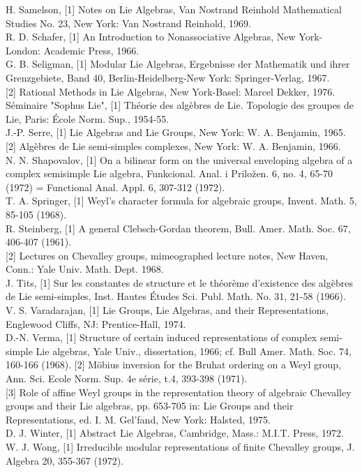 \documentclass[10pt]{article}
\begin{document}
H. Samelson, [1] Notes on Lie Algebras, Van Nostrand Reinhold Mathematical Studies No. 23, New York: Van Nostrand Reinhold, 1969.\\[0pt]
R. D. Schafer, [1] An Introduction to Nonassociative Algebras, New York-London: Academic Press, 1966.\\[0pt]
G. B. Seligman, [1] Modular Lie Algebras, Ergebnisse der Mathematik und ihrer Grenzgebiete, Band 40, Berlin-Heidelberg-New York: Springer-Verlag, 1967.\\[0pt]
[2] Rational Methods in Lie Algebras, New York-Basel: Marcel Dekker, 1976.\\[0pt]
Séminaire "Sophus Lie", [1] Théorie des algèbres de Lie. Topologie des groupes de Lie, Paris: École Norm. Sup., 1954-55.\\[0pt]
J.-P. Serre, [1] Lie Algebras and Lie Groups, New York: W. A. Benjamin, 1965.\\[0pt]
[2] Algèbres de Lie semi-simples complexes, New York: W. A. Benjamin, 1966.\\[0pt]
N. N. Shapovalov, [1] On a bilinear form on the universal enveloping algebra of a complex semisimple Lie algebra, Funkcional. Anal. i Priložen. 6, no. 4, 65-70 (1972) = Functional Anal. Appl. 6, 307-312 (1972).\\[0pt]
T. A. Springer, [1] Weyl's character formula for algebraic groups, Invent. Math. 5, 85-105 (1968).\\[0pt]
R. Steinberg, [1] A general Clebsch-Gordan theorem, Bull. Amer. Math. Soc. 67, 406-407 (1961).\\[0pt]
[2] Lectures on Chevalley groups, mimeographed lecture notes, New Haven, Conn.: Yale Univ. Math. Dept. 1968.\\[0pt]
J. Tits, [1] Sur les constantes de structure et le théorème d'existence des algèbres de Lie semi-simples, Inst. Hautes Études Sci. Publ. Math. No. 31, 21-58 (1966).\\[0pt]
V. S. Varadarajan, [1] Lie Groups, Lie Algebras, and their Representations, Englewood Cliffs, NJ: Prentice-Hall, 1974.\\[0pt]
D.-N. Verma, [1] Structure of certain induced representations of complex semi-simple Lie algebras, Yale Univ., dissertation, 1966; cf. Bull Amer. Math. Soc. 74, 160-166 (1968). [2] Möbius inversion for the Bruhat ordering on a Weyl group, Ann. Sci. Ecole Norm. Sup. 4e série, t.4, 393-398 (1971).\\[0pt]
[3] Role of affine Weyl groups in the representation theory of algebraic Chevalley groups and their Lie algebras, pp. 653-705 in: Lie Groups and their Representations, ed. I. M. Gel'fand, New York: Halsted, 1975.\\[0pt]
D. J. Winter, [1] Abstract Lie Algebras, Cambridge, Mass.: M.I.T. Press, 1972.\\[0pt]
W. J. Wong, [1] Irreducible modular representations of finite Chevalley groups, J. Algebra 20, 355-367 (1972).
\end{document}
